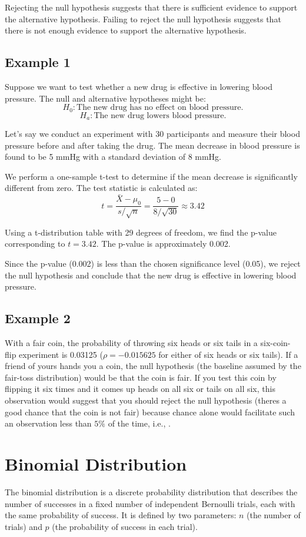 \documentclass{article}
\begin{document}
Rejecting the null hypothesis suggests that there is sufficient evidence to support the alternative hypothesis. Failing to reject the null hypothesis suggests that there is not enough evidence to support the alternative hypothesis.

\subsection{Example 1}
Suppose we want to test whether a new drug is effective in lowering blood pressure. The null and alternative hypotheses might be:
\[
H_0: \text{The new drug has no effect on blood pressure.}
\]
\[
H_a: \text{The new drug lowers blood pressure.}
\]

Let's say we conduct an experiment with 30 participants and measure their blood pressure before and after taking the drug. The mean decrease in blood pressure is found to be 5 mmHg with a standard deviation of 8 mmHg.

We perform a one-sample t-test to determine if the mean decrease is significantly different from zero. The test statistic is calculated as:
\[
t = \frac{\bar{X} - \mu_0}{s / \sqrt{n}} = \frac{5 - 0}{8 / \sqrt{30}} \approx 3.42
\]

Using a t-distribution table with 29 degrees of freedom, we find the p-value corresponding to \(t = 3.42\). The p-value is approximately 0.002.

Since the p-value (0.002) is less than the chosen significance level (0.05), we reject the null hypothesis and conclude that the new drug is effective in lowering blood pressure.

\subsection{Example 2}
With a fair coin, the probability of throwing six heads or six tails in a six-coin-flip experiment is 0.03125 (\(\rho=-0.015625\) for either of six heads or six tails). 
If a friend of yours hands you a coin, the null hypothesis (the baseline assumed by the fair-toss distribution) would be that the coin is fair. 
If you test this coin by flipping it six times and it comes up heads on all six or tails on all six, this observation would suggest that you should reject the null hypothesis (theres a good chance that the coin is not fair) because chance alone would facilitate such an observation less than \(5\%\) of the time, i.e., 
.

\section{Binomial Distribution}
The binomial distribution is a discrete probability distribution that describes the number of successes in a fixed number of independent Bernoulli trials, each with the same probability of success. It is defined by two parameters: \(n\) (the number of trials) and \(p\) (the probability of success in each trial).
\end{document}
